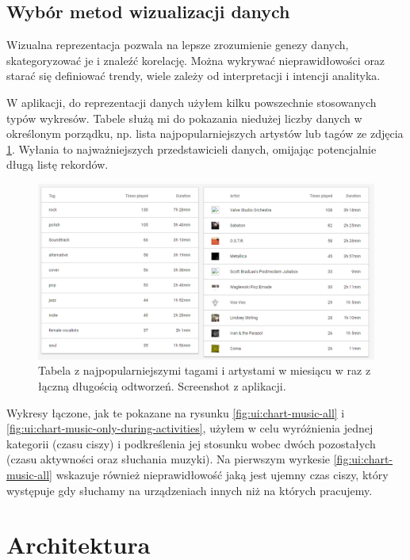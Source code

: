 \documentclass[openright]{xmgr}
\begin{document}
    \section{Wybór metod wizualizacji danych}

    Wizualna reprezentacja pozwala na lepsze zrozumienie genezy danych, skategoryzować je i znaleźć korelację.
    Można wykrywać nieprawidłowości oraz starać się definiować trendy, wiele zależy od interpretacji i intencji analityka.
    \cite{charts:excel-comparsion}

    W aplikacji, do reprezentacji danych użyłem kilku powszechnie stosowanych typów wykresów.
    Tabele służą mi do pokazania niedużej liczby danych w określonym porządku,
    np. lista najpopularniejszych artystów lub tagów ze zdjęcia \ref{fig:ui:table-popular-music-tags}.
    Wyłania to najważniejszych przedstawicieli danych, omijając potencjalnie długą listę rekordów.

    \begin{figure}
        \includegraphics[width=\linewidth]{fig/ui/table-popular-music-tags.png}
        \caption{Tabela z najpopularniejszymi tagami i artystami w miesiącu w raz z łączną długością odtworzeń. Screenshot z aplikacji.}
        \label{fig:ui:table-popular-music-tags}
    \end{figure}

    Wykresy łączone, jak te pokazane na rysunku \ref{fig:ui:chart-music-all} i \ref{fig:ui:chart-music-only-during-activities},
    użyłem w celu wyróżnienia jednej kategorii (czasu ciszy) i podkreślenia jej stosunku wobec dwóch pozostałych (czasu aktywności oraz słuchania muzyki).
    Na pierwszym wyrkesie \ref{fig:ui:chart-music-all} wskazuje również nieprawidłowość jaką jest ujemny czas ciszy,
    który występuje gdy słuchamy na urządzeniach innych niż na których pracujemy.

\chapter{Architektura}
\end{document}
